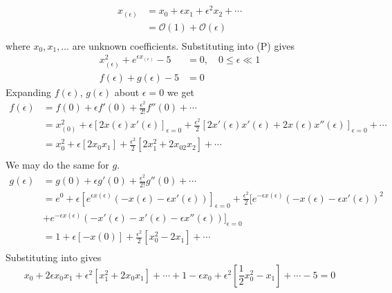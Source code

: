 \documentclass[12pt]{article}
\begin{document}
\begin{equation*}
  \begin{aligned}
    x_{(\epsilon)}&=x_0+\epsilon x_1 + \epsilon^2x_2+\cdots \\
    &= \mathcal{O}(1) + \mathcal{O}(\epsilon) \\
  \end{aligned}
\end{equation*}
where $x_0, x_1,\ldots$ are unknown coefficients. Substituting into (P) gives
\begin{equation*}
  \begin{aligned}
    x^2_{(\epsilon)}+e^{\epsilon x_{(\epsilon)}} - 5 &= 0,\quad 0\le\epsilon\ll1 \\
    f(\epsilon) + g(\epsilon) -5 &= 0
  \end{aligned}
\end{equation*}
Expanding $f(\epsilon)$, $g(\epsilon)$ about $\epsilon=0$ we get
\begin{equation*}
  \begin{aligned}
    f(\epsilon) &= f(0) + \epsilon f'(0) + \frac{\epsilon^2}{2!}f''(0)+\cdots \\
    &= x^2_{(0)} + \epsilon[2x(\epsilon)x'(\epsilon)]_{\epsilon=0} +
    \frac{\epsilon^2}{2}[2x'(\epsilon)x'(\epsilon)+2x(\epsilon)x''(\epsilon)]_{\epsilon=0}
    + \cdots \\
    &= x_0^2+\epsilon[2x_0x_1] + \frac{\epsilon^2}{2}[2x_1^2 + 2x_02x_2] + \cdots \\
  \end{aligned}
\end{equation*}
We may do the same for $g$.
\begin{equation*}
  \begin{aligned}
    g(\epsilon) &= g(0) + \epsilon g'(0) + \frac{\epsilon^2}{2!}g''(0) + \cdots \\
    &= e^0+\epsilon[e^{\epsilon x(\epsilon)}(-x(\epsilon)-\epsilon x'(\epsilon))]_{\epsilon=0}
    + \frac{\epsilon^2}{2}[e^{-\epsilon x(\epsilon)}(-x(\epsilon)-\epsilon x'(\epsilon))^2 \\
    &+ e^{-\epsilon x(\epsilon)}(-x'(\epsilon)-x'(\epsilon)-\epsilon x''(\epsilon))]_{\epsilon=0} \\
    &= 1 + \epsilon[-x(0)]+\frac{\epsilon^2}{2}[x_0^2-2x_1] + \cdots \\
  \end{aligned}
\end{equation*}
Substituting into  gives
\begin{equation*}
  x_0 + 2\epsilon x_0x_1+\epsilon^2[x_1^2+2x_0x_1]+\cdots + 1 - \epsilon x_0 +
  \epsilon^2[\frac{1}{2}x_0^2-x_1] + \cdots - 5 = 0
\end{equation*}
\end{document}
